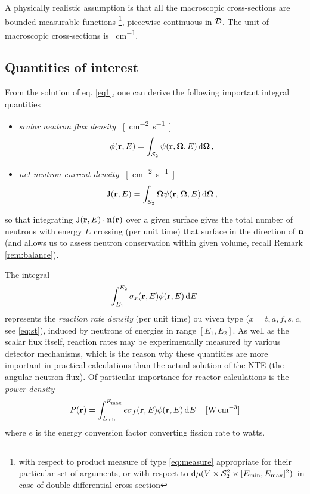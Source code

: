 A physically realistic assumption is that all the macroscopic cross-sections are bounded measurable functions
\footnote{with respect to product measure of type \eqref{eq:measure} appropriate for their particular set of arguments,
 or with respect to $\text{d}\mu(V\times\mathcal{S}_2^2\times [E_{\text{min}},E_{\text{max}}]^2)\,$ in case of double-differential cross-section},
 piecewise continuous in $\mathcal{D}$. The unit of macroscopic cross-sections is \SI{}{cm^{-1}}.

\subsection{Quantities of interest}\label{sec:qoi}
From the solution of eq. \eqref{eq1}, one can derive the following important integral quantities
\begin{itemize}
  \item \textit{scalar neutron flux density} \SI{}{[cm^{-2}.s^{-1}]}
  \begin{equation}\label{eq:scalar_flux}
    \phi(\mathbf{r}, E) = \int_{\mathcal{S}_2}\psi(\mathbf{r},\mathbf{\Omega},E)\,\text{d}\mathbf{\Omega}\,,
  \end{equation}
  \item \textit{net neutron current density} \SI{}{[cm^{-2}.s^{-1}]}
	\begin{equation}\label{eq:bJ}
		\mathrm{J}(\mathbf{r}, E)	= \int_{\mathcal{S}_2}\mathbf{\Omega}\psi(\mathbf{r},\mathbf{\Omega},E)\,\text{d}\mathbf{\Omega}\,,
	\end{equation}
\end{itemize}
so that integrating $\mathrm{J}(\mathbf{r},E)\cdot\mathbf{n}(\mathbf{r})$ over a given surface 
gives the total number of neutrons with energy $E$ crossing (per unit time) that surface in the direction of 
$\mathbf{n}$ (and allows us to assess neutron conservation within given volume, recall Remark \ref{rem:balance}).

The integral
\begin{equation}\label{eq:rr}
  \int_{E_1}^{E_2}\sigma_x(\mathbf{r}, E) \phi(\mathbf{r}, E)\,\text{d}E\,
\end{equation}
represents the \textit{reaction rate density} (per unit time) ou viven type ($x = t,a,f,s,c$, see \eqref{eq:st}), 
induced by neutrons of energies in range $[E_1, E_2]$. 
As well as the scalar flux itself, reaction rates may be experimentally measured
by various detector mechanisms, which is the reason why these quantities are more important in practical calculations
than the actual solution of the NTE (the angular neutron flux). Of particular importance for reactor calculations is the
\textit{power density} 
\begin{equation}\label{eq:power}
	P(\mathbf{r}) = \int_{E_{\text{min}}}^{E_{\text{max}}}e\sigma_f(\mathbf{r}, E) \phi(\mathbf{r}, E)\,\text{d}E\, \quad \SI{}{[W.cm^{-3}]}
\end{equation}
where $e$ is the energy conversion factor converting fission rate to watts.

